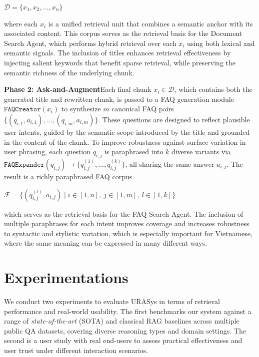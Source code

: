 \documentclass[11pt]{article}
\begin{document}
\smallskip
\centerline{ 
$ \displaystyle \mathcal{D} = \{x_1, x_2, \dots, x_n\}$}
\smallskip

\noindent where each $x_i$ is a unified retrieval unit that combines a semantic anchor with its associated content. This corpus serves as the retrieval basis for the Document Search Agent, which performs hybrid retrieval over each $x_i$ using both lexical and semantic signals. The inclusion of titles enhances retrieval effectiveness by injecting salient keywords that benefit sparse retrieval, while preserving the semantic richness of the underlying chunk.

\smallskip
\noindent
\textbf{Phase 2: Ask-and-Augment}\quad Each final chunk $x_i \in \mathcal{D}$, which contains both the generated title and rewritten chunk, is passed to a FAQ generation module $\texttt{FAQCreator}(x_i)$ to synthesize $m$ canonical FAQ pairs $\{(q_{i,1}, a_{i,1}), \dots, (q_{i,m}, a_{i,m})\}$. These questions are designed to reflect plausible user intents, guided by the semantic scope introduced by the title and grounded in the content of the chunk. To improve robustness against surface variation in user phrasing, each question $q_{i,j}$ is paraphrased into $k$ diverse variants via $\texttt{FAQExpander}(q_{i,j}) \rightarrow \{q_{i,j}^{(1)}, \dots, q_{i,j}^{(k)}\}$, all sharing the same answer $a_{i,j}$. The result is a richly paraphrased FAQ corpus

\smallskip
\centerline{$\displaystyle 
\mathcal{F} = \{(q_{i,j}^{(l)}, a_{i,j}) \mid i \in [1,n],\ j \in [1,m],\ l \in [1,k]\}$}

\smallskip

\noindent which serves as the retrieval basis for the FAQ Search Agent. The inclusion of multiple paraphrases for each intent improves coverage and increases robustness to syntactic and stylistic variation, which is especially important for Vietnamese, where the same meaning can be expressed in many different ways.

\section{Experimentations}
\label{sec:experiments}

We conduct two experiments to evaluate URASys in terms of retrieval performance and real-world usability. The first benchmarks our system against a range of \textit{state-of-the-art} (SOTA) and classical RAG baselines across multiple public QA datasets, covering diverse reasoning types and domain settings. The second is a user study with real end-users to assess practical effectiveness and user trust under different interaction scenarios.
\end{document}
